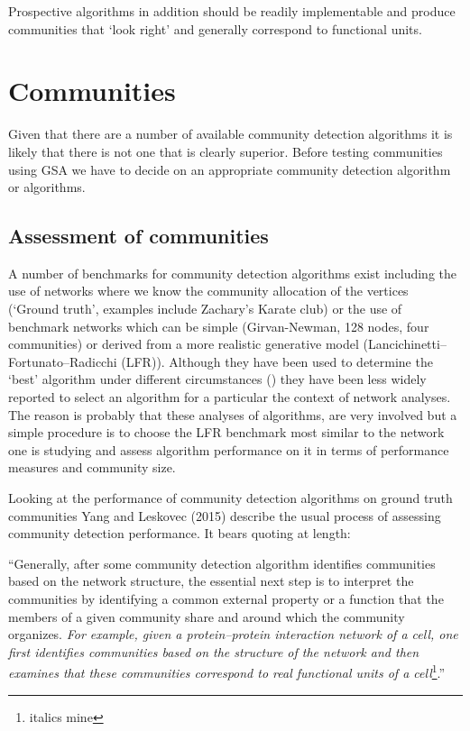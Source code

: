 Prospective algorithms in addition should be readily implementable and produce communities that `look right' and generally correspond to functional units. 


\section{Communities}
\label{sec:alternate intro}

Given that there are a number of available community detection algorithms it is likely that there is not one that is clearly superior\cite{aldecoa2013exploring}. Before testing communities using GSA we have to decide on an appropriate community detection algorithm or algorithms.

\subsection{Assessment of communities}
\label{sec:assessment of communities}
A number of benchmarks for community detection algorithms exist including the use of networks where we know the community allocation of the vertices (`Ground truth'\cite{yang2015defining}, examples include Zachary's Karate club\cite{zachary1977information}) or the use of benchmark networks which can be simple (Girvan-Newman, 128 nodes, four communities\cite{girvan2002community}) or derived from a more realistic generative model (Lancichinetti–Fortunato–Radicchi (LFR)\cite{lancichinetti2008benchmark}). Although they have been used to determine the `best' algorithm under different circumstances (\cite{yang2016comparative}) they have been less widely reported to select an algorithm for a particular the context of network analyses. The reason is probably that these analyses of algorithms\cite{yang2016comparative}, \cite{aldecoa2013exploring} are very involved but a simple procedure is to choose the LFR benchmark most similar to the network one is studying and assess algorithm performance on it in terms of performance measures and community size. 

Looking at the performance of community detection algorithms on ground truth communities Yang and Leskovec (2015) describe the usual process of assessing community detection performance. It bears quoting at length:

``Generally, after some community detection algorithm identifies communities based on the network structure, the essential next step is to interpret the communities by identifying a common external property or a function that the members of a given community share and around which the community organizes. \textit{For example, given a protein–protein interaction network of a cell, one first identifies communities based on the structure of the network and then examines that these communities correspond to real functional units of a cell}\cite{yang2015defining}\footnote{italics mine}.'' 

